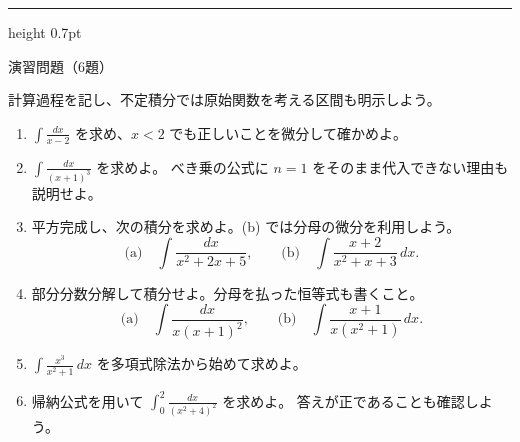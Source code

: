 \documentclass[a4paper,10pt,pdflatex,ja=standard,jafont=ipaex-type1,
  magstyle=real,scale=1]{bxjsarticle}
\newcommand{\topic}[1]{\par\vspace{5pt}%
  {\large\sffamily\mdseries\color{accent}#1}\par\vspace{2pt}}
\newenvironment{problems}
  {\begin{enumerate}[leftmargin=2em,itemsep=3pt,topsep=3pt,parsep=0pt,
    font=\color{accent}]}
  {\end{enumerate}}
\newcommand{\problemspace}{\par\vspace{5mm}}
\newcommand{\exercises}{%
  {\color{accent}\hrule height 0.7pt}\vspace{3pt}%
  \topic{演習問題（6題）}%
  {\small 計算過程を記し、不定積分では原始関数を考える区間も明示しよう。}\par}
\begin{document}
\noindent\begin{minipage}[b][0.5\textheight][t]{\linewidth}
\exercises
\begin{problems}
\item $\displaystyle\int\frac{dx}{x-2}$ を求め、$x<2$ でも正しいことを微分して確かめよ。
\problemspace

\item $\displaystyle\int\frac{dx}{(x+1)^3}$ を求めよ。
べき乗の公式に $n=1$ をそのまま代入できない理由も説明せよ。
\problemspace

\item 平方完成し、次の積分を求めよ。(b) では分母の微分を利用しよう。
$$
 \text{(a)}\quad\int\frac{dx}{x^2+2x+5},\qquad
 \text{(b)}\quad\int\frac{x+2}{x^2+x+3}\,dx.
$$
\problemspace

\item 部分分数分解して積分せよ。分母を払った恒等式も書くこと。
$$
 \text{(a)}\quad\int\frac{dx}{x(x+1)^2},\qquad
 \text{(b)}\quad\int\frac{x+1}{x(x^2+1)}\,dx.
$$
\problemspace

\item $\displaystyle\int\frac{x^3}{x^2+1}\,dx$ を多項式除法から始めて求めよ。
\problemspace

\item 帰納公式を用いて $\displaystyle\int_0^2\frac{dx}{(x^2+4)^2}$ を求めよ。
答えが正であることも確認しよう。
\problemspace
\end{problems}
\end{minipage}
\end{document}
